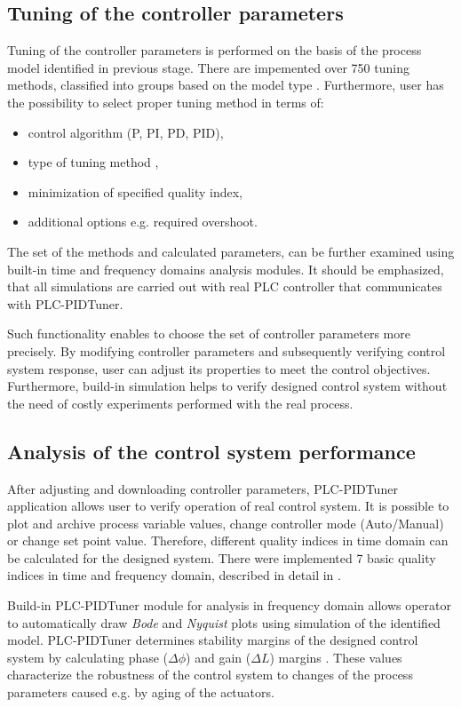\documentclass{amcs}
\begin{document}
\subsection{Tuning of the controller parameters}
%
Tuning of the controller parameters is performed on the basis of the process model identified in previous stage. There are impemented over 750 tuning methods, classified into groups based on the model type \cite{Odwyer:2009}. Furthermore, user has the possibility to select proper tuning method in terms of:
%
\begin{itemize}
	\item control algorithm (P, PI, PD, PID),
	\item type of tuning method \cite{Odwyer:2009},
	\item minimization of specified quality index,
	\item additional options e.g. required overshoot.
\end{itemize}

The set of the methods and calculated parameters, can be further examined using  built-in time and frequency domains analysis modules. It should be emphasized, that all simulations are carried out with real PLC controller that communicates with PLC-PIDTuner.

Such functionality enables to choose the set of controller parameters more precisely. By modifying controller parameters and subsequently verifying control system response, user can adjust its properties to meet the control objectives. Furthermore, build-in simulation helps to verify designed control system without the need of costly experiments performed with the real process.
%
\subsection{Analysis of the control system performance}
%
After adjusting and downloading controller parameters, PLC-PIDTuner application allows user to verify operation of real control system. It is possible to plot and archive process variable values, change controller mode (Auto/Manual) or change set point value. Therefore, different quality indices in time domain can be calculated for the designed system. There were implemented 7 basic quality indices in time and frequency domain, described in detail in \cite{Kolaj:2015}.

Build-in PLC-PIDTuner module for analysis in frequency domain  allows operator to automatically draw \textit{Bode} and \textit{Nyquist} plots using simulation of the identified model. PLC-PIDTuner determines stability margins of the designed control system by calculating phase ($\Delta \phi$) and gain ($\Delta L$) margins \cite{Bishop:2010} \cite{Holejko:2012}. These values characterize the robustness of the control system to changes of the process parameters caused e.g. by aging of the actuators. 
\end{document}
